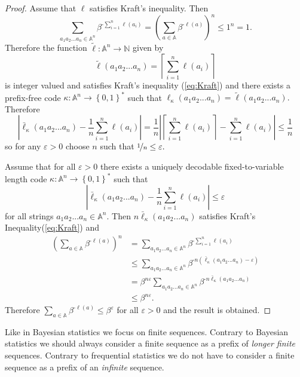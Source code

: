 \documentclass[10pt,a4paper,draft]{article}
\begin{document}
\begin{proof}
Assume that $\ell$ satisfies Kraft's inequality. Then 
\[
\sum_{a_{1}a_{2}...a_{n}\in\mathbb{A}^{n}}\beta^{\textrm{-}\sum_{i=1}^{n}\ell\left(a_{i}\right)}=\left(\sum_{a\in\mathbb{A}}\beta^{\textrm{-}\ell\left(a\right)}\right)^{n}\leq1^{n}=1.
\]
Therefore the function
$\tilde{\ell}:\mathbb{A}^{n}\rightarrow\mathbb{N}$
given by 
\[
\tilde{\ell}\left(a_{1}a_{2}...a_{n}\right)=\left\lceil
\sum_{i=1}^{n}\ell\left(a_{i}\right)\right\rceil
\]
is integer valued and satisfies Kraft's inequality (\ref{eq:Kraft}) and there
exists a prefix-free code $\kappa:\mathbb{A}^{n}\rightarrow\left\{
0,1\right\} ^{\ast}$ such that $\ell_{\kappa}\left(a_{1}a_{2}...a_{n}\right)=\tilde{\ell}\left(a_{1}a_{2}...a_{n}\right).$
Therefore 
\[
\left\vert
\bar{\ell}_{\kappa}\left(a_{1}a_{2}...a_{n}\right)-\frac{1}{n}\sum_{i=1}^{n}\ell\left(a_{i}\right)\right\vert
=\frac{1}{n}\left\vert
\left\lceil \sum_{i=1}^{n}\ell\left(a_{i}\right)\right\rceil
-\sum_{i=1}^{n}\ell\left(a_{i}\right)\right\vert \leq\frac{1}{n}
\]
so for any $\varepsilon>0$ choose $n$ such that
$\nicefrac{1}{n}\leq\varepsilon.$

Assume that for all $\varepsilon>0$ there exists a uniquely
decodable fixed-to-variable length code
$\kappa:\mathbb{A}^{n}\rightarrow\left\{ 0,1\right\} ^{\ast}$
such that 
\[
\left\vert
\bar{\ell}_{\kappa}\left(a_{1}a_{2}...a_{n}\right)-\frac{1}{n}\sum_{i=1}^{n}\ell\left(a_{i}\right)\right\vert
\leq\varepsilon
\]
for all strings $a_{1}a_{2}...a_{n}\in\mathbb{A}^{n}.$ Then
$n\bar{\ell}_{\kappa}\left(a_{1}a_{2}...a_{n}\right)$
satisfies Kraft's Inequality(\ref{eq:Kraft}) and 
\begin{align*}
\left(\sum_{a\in\mathbb{A}}\beta^{\textrm{-}\ell\left(a\right)}\right)^{n}
&
=\sum_{a_{1}a_{2}...a_{n}\in\mathbb{A}^{n}}\beta^{\textrm{-}\sum_{i=1}^{n}\ell\left(a_{i}\right)}\\
&
\leq\sum_{a_{1}a_{2}...a_{n}\in\mathbb{A}^{n}}\beta^{\textrm{-}n\left(\bar{\ell}_{\kappa}\left(a_{1}a_{2}...a_{n}\right)-\varepsilon\right)}\\
&
=\beta^{n\varepsilon}\sum_{a_{1}a_{2}...a_{n}\in\mathbb{A}^{n}}\beta^{\textrm{-}n\bar{\ell}_{\kappa}\left(a_{1}a_{2}...a_{n}\right)}\\
 & \leq\beta^{n\varepsilon}.
\end{align*}
Therefore
$\sum_{a\in\mathbb{A}}\beta^{\textrm{-}\ell\left(a\right)}\leq\beta^{\varepsilon}$
for all $\varepsilon>0$ and the result is obtained.
\end{proof}
Like in Bayesian statistics we focus on finite sequences.
Contrary to Bayesian statistics we should always consider a finite
sequence as a prefix of \emph{longer finite} sequences. Contrary to
frequential statistics we do not have to consider a finite sequence as a
prefix of an \emph{infinite} sequence.
\end{document}
